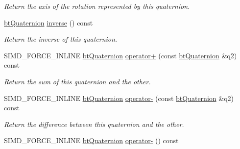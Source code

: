 \begin{CompactItemize}
\begin{CompactList}\small\item\em Return the axis of the rotation represented by this quaternion. \item\end{CompactList}\item 
\hypertarget{classbt_quaternion_a8894800b346577a9a568048d10e09d0}{
\hyperlink{classbt_quaternion}{btQuaternion} \hyperlink{classbt_quaternion_a8894800b346577a9a568048d10e09d0}{inverse} () const }
\label{classbt_quaternion_a8894800b346577a9a568048d10e09d0}

\begin{CompactList}\small\item\em Return the inverse of this quaternion. \item\end{CompactList}\item 
SIMD\_\-FORCE\_\-INLINE \hyperlink{classbt_quaternion}{btQuaternion} \hyperlink{classbt_quaternion_e59598d8706cfaaf716509f93846010e}{operator+} (const \hyperlink{classbt_quaternion}{btQuaternion} \&q2) const 
\begin{CompactList}\small\item\em Return the sum of this quaternion and the other. \item\end{CompactList}\item 
SIMD\_\-FORCE\_\-INLINE \hyperlink{classbt_quaternion}{btQuaternion} \hyperlink{classbt_quaternion_10ee93d7c0a20d0630fa8e8de85bad0c}{operator-} (const \hyperlink{classbt_quaternion}{btQuaternion} \&q2) const 
\begin{CompactList}\small\item\em Return the difference between this quaternion and the other. \item\end{CompactList}\item 
\hypertarget{classbt_quaternion_77ad84755dacf77b05210907a42ca8c3}{
SIMD\_\-FORCE\_\-INLINE \hyperlink{classbt_quaternion}{btQuaternion} \hyperlink{classbt_quaternion_77ad84755dacf77b05210907a42ca8c3}{operator-} () const }
\label{classbt_quaternion_77ad84755dacf77b05210907a42ca8c3}


\end{CompactItemize}
